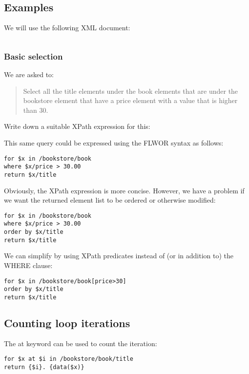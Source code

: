 \documentclass[slides]{pgnotes}
\begin{document}
\subsection{Examples}

We will use the following XML document:

\inputminted{xml}{books.xml}


\subsubsection{Basic selection}

We are asked to:
\begin{quotation}
Select all the title elements under the book elements that are under the bookstore element that have a price element with a value that is higher than 30.
\end{quotation}

Write down a suitable XPath expression for this: 

\vspace{\fill}

This same query could be expressed using the FLWOR syntax as follows:

\begin{verbatim}
for $x in /bookstore/book
where $x/price > 30.00
return $x/title
\end{verbatim}

Obviously, the XPath expression is more concise. 
However, we have a problem if we want the returned element list to be ordered or otherwise modified:

\begin{verbatim}
for $x in /bookstore/book
where $x/price > 30.00
order by $x/title
return $x/title
\end{verbatim}

We can simplify by using XPath predicates instead of (or in addition to) the WHERE clause: 

\begin{verbatim}
for $x in /bookstore/book[price>30]
order by $x/title
return $x/title
\end{verbatim}

\subsection{Counting loop iterations}

The at keyword can be used to count the iteration:

\begin{verbatim}
for $x at $i in /bookstore/book/title
return {$i}. {data($x)}
\end{verbatim}
\end{document}
